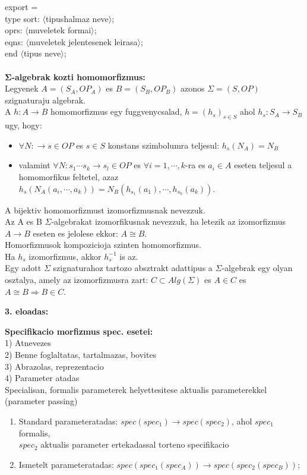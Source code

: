 \documentclass[a4paper,10pt]{article}
\begin{document}
\indent export = \\
\indent \indent type sort: $\langle$tipushalmaz neve$\rangle$;\\
\indent \indent oprs:	$\langle$muveletek formai$\rangle$;\\
\indent \indent eqns:	$\langle$muveletek jelentesenek leirasa$\rangle$;\\
end $\langle$tipus neve$\rangle$;\\ \\
$\mathbf{\Sigma}$\textbf{-algebrak kozti homomorfizmus:}\\
Legyenek $A=(S_A,OP_A)$ es $B = (S_B, OP_B)$ azonos $\Sigma=(S, OP)$ szignaturaju algebrak.\\
A $h:A\to B$ homomorfizmus egy fuggvenycsalad, $h = (h_s)_{s \in S}$ ahol $h_s: S_A \to S_B$ ugy, hogy:
\begin{itemize}
\item $\forall N:\to s \in OP$ es $s \in S$ konstans szimbolumra teljesul: $h_s(N_A)= N_B$
\item valamint $\forall N: s_1 \cdots s_k \to s_l \in OP$ es $\forall i=1, \cdots, k$-ra es $a_i \in A$  eseten teljesul a homomorfikus feltetel, azaz $h_s(N_A(a_i,\cdots,a_k))= N_B(h_{s_1}(a_1),\cdots,h_{s_k}(a_k))$.
\end{itemize}
A bijektiv homomorfizmust izomorfizmusnak nevezzuk.\\
Az A es B $\Sigma$-algebrakat izomorfikusnak nevezzuk, ha letezik az izomorfizmus $A \to B$ eseten es jelolese ekkor: $A\cong B$.\\
Homorfizmusok kompozicioja szinten homomorfizmus.\\
Ha $h_s$ izomorfizmus, akkor $h_s^{-1}$ is az.\\
Egy adott $\Sigma$ szignaturahoz tartozo absztrakt adattipus a $\Sigma$-algebrak egy olyan osztalya,  amely az izomorfizmusra zart: $C \subset Alg(\Sigma)$ es $A \in C$ es $A \cong B \Rightarrow B \in C$.
\newpage
%
%
\begin{flushleft}
\textbf{3. eloadas:}
\end{flushleft}
\textbf{Specifikacio morfizmus spec. esetei:}\\
1) Atnevezes\\
2) Benne foglaltatas, tartalmazas, bovites\\
3) Abrazolas, reprezentacio\\
4) Parameter atadas\\
Specialisan, formalis parameterek helyettesitese aktualis parameterekkel (parameter passing)
\begin{enumerate}
\item Standard parameteratadas: $spec(spec_1) \to spec(spec_2)$, ahol $spec_1$ formalis,\\
$spec_2$ aktualis parameter ertekadassal torteno specifikacio
\item Ismetelt parameteratadas: $spec(spec_1(spec_A)) \to spec(spec_2(spec_B))$;
\end{enumerate}
\end{document}

